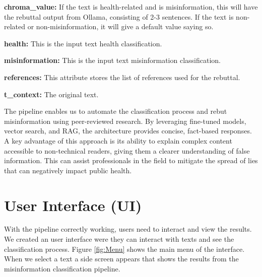 \begin{description}
\item{\textbf{chroma\_value:}} If the text is health-related and is misinformation, this will have the rebuttal output from Ollama, consisting of 2-3 sentences. If the text is non-related or non-misinformation, it will give a default value saying so. 
\item{\textbf{health:}} This is the input text health classification.
\item{\textbf{misinformation:}} This is the input text misinformation classification.
\item{\textbf{references:}} This attribute stores the list of references used for the rebuttal. 
\item{\textbf{t\_context:}} The original text.

\end{description}

The pipeline enables us to automate the classification process and rebut misinformation using peer-reviewed research. By leveraging fine-tuned models, vector search, and RAG, the architecture provides concise, fact-based responses. A key advantage of this
approach is its ability to explain complex content accessible to non-technical readers, giving them a clearer understanding of false information. This can assist professionals in the field to mitigate the spread of lies that can negatively impact public health.


\section{User Interface (UI)}
With the pipeline correctly working, users need to interact and view the results. We created an user interface were they can interact with texts and see the classification process. Figure \ref{fig:Menu} shows the main menu of the interface. When we select a text a side screen appears that shows the results from the misinformation classification pipeline. 

